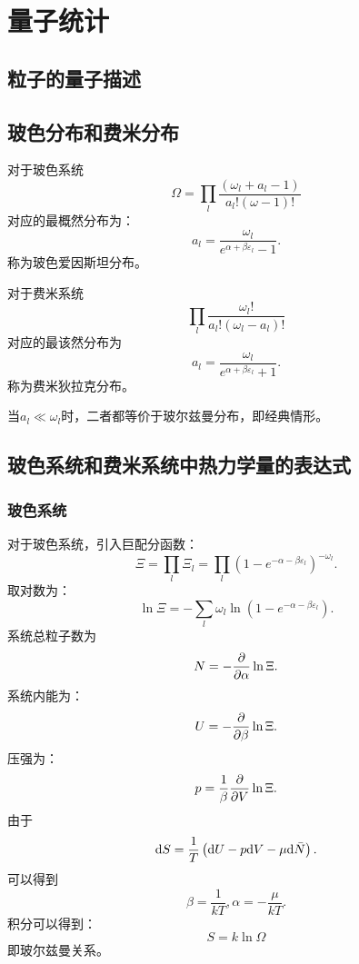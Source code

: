\chapter{量子统计}
\section{粒子的量子描述}
\section{玻色分布和费米分布}
对于玻色系统
\begin{equation}
    \Omega=\prod_l\frac{(\omega_l+a_l-1)}{a_l!(\omega-1)!}
\end{equation}
对应的最概然分布为：
\begin{equation}
    a_l=\frac{\omega_l}{e^{\alpha+\beta\varepsilon_l}-1}.
\end{equation}
称为玻色爱因斯坦分布。


对于费米系统 
\begin{equation}
    \prod_l\frac{\omega_l!}{a_l!(\omega_l-a_l)!}
\end{equation}
对应的最该然分布为
\begin{equation}
    a_l=\frac{\omega_l}{e^{\alpha+\beta\varepsilon_l}+1}.
\end{equation}
称为费米狄拉克分布。

当$a_l\ll \omega_l$时，二者都等价于玻尔兹曼分布，即经典情形。

\section{玻色系统和费米系统中热力学量的表达式}
\subsection{玻色系统}
对于玻色系统，引入巨配分函数：
\begin{equation}
    \Xi=\prod_l\Xi_l=\prod_l\left(1-e^{-\alpha-\beta\varepsilon_l}\right)^{-\omega_l}.
\end{equation}
取对数为：
\begin{equation}
    \ln\Xi=-\sum_l\omega_l\ln(1-e^{-\alpha-\beta\varepsilon_l}).
\end{equation}
系统总粒子数为
\begin{equation}
    N=-\frac{\partial }{\partial \alpha}\ln\Xi.
\end{equation}
系统内能为：
\begin{equation}
    U=-\frac{\partial }{\partial \beta}\ln \Xi.
\end{equation}
压强为：
\begin{equation}
    p=\frac{1}{\beta}\frac{\partial }{\partial V}\ln\Xi.
\end{equation}
由于
\begin{equation}
    \mathrm{d} S=\frac{1}{T}\left(\mathrm{d} U-p\mathrm{d} V -\mu\mathrm{d}\bar{N}\right).
\end{equation}
可以得到
\begin{equation}
    \beta=\frac{1}{kT}, \alpha =-\frac{\mu}{kT}.
\end{equation}
积分可以得到：
\begin{equation}
    S=k\ln\Omega
\end{equation}
即玻尔兹曼关系。

